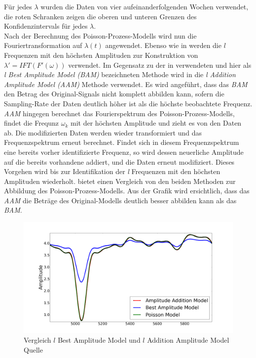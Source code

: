 Für jedes $\lambda$ wurden die Daten von vier aufeinanderfolgenden Wochen verwendet, die roten Schranken zeigen die oberen und unteren Grenzen des Konfidenzintervals für jedes $\lambda$. \\
Nach der Berechnung des Poisson-Prozess-Modells wird nun die Fouriertransformation auf $\lambda (t)$ angewendet. Ebenso wie in \cite{Krajnik.2014} werden die $l$ Frequenzen mit den höchsten Amplituden zur Konstruktion von $\lambda' = IFT(F'(\omega))$ verwendet. Im Gegensatz zu der in \cite{Krajnik.2014} verwendeten und hier als \textit{l Best Amplitude Model (BAM)} bezeichneten Methode wird in \cite{Jovan.2016} die \textit{l Addition Amplitude Model (AAM)} Methode verwendet. Es wird angeführt, dass das \textit{BAM} den Betrag des Original-Signals nicht komplett abbilden kann, sofern die Sampling-Rate der Daten deutlich höher ist als die höchste beobachtete Frequenz. \\ \textit{AAM} hingegen berechnet das Fourierspektrum des Poisson-Prozess-Modells, findet die Frequnz $\omega_k$ mit der höchsten Amplitude und zieht es von den Daten ab. Die modifizierten Daten werden wieder transformiert und das Frequenzspektrum erneut berechnet. Findet sich in diesem Frequenzspektrum eine bereits vorher identifizierte Frequenz, so wird dessen neuerliche Amplitude auf die bereits vorhandene addiert, und die Daten erneut modifiziert. Dieses Vorgehen wird bis zur Identifikation der \textit{l} Frequenzen mit den höchsten Amplituden wiederholt.  bietet einen Vergleich von den beiden Methoden zur Abbildung des Poisson-Prozess-Modells. Aus der Grafik wird ersichtlich, dass das \textit{AAM} die Beträge des Original-Modells deutlich besser abbilden kann als das \textit{BAM}.

\begin{figure}[!ht]
	\centering
	\includegraphics[width=0.7\linewidth]{Abbildungen/BAM_AAM}
	\caption{Vergleich $l$ Best Amplitude Model und $l$ Addition Amplitude Model Quelle \cite{Jovan.2016}}
	\label{fig.BAM_AAM_Vergleich}
\end{figure}

